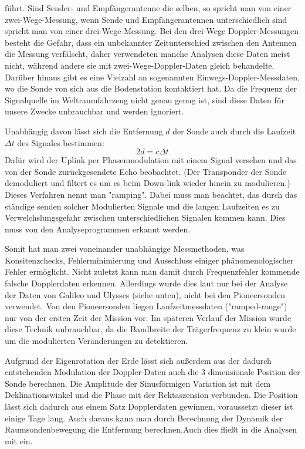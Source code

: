 führt.
Sind Sender- und Empfängerantenne die selben, so spricht man von einer zwei-Wege-Messung, wenn Sende und Empfängerantennen unterschiedlich sind spricht man von einer drei-Wege-Messung.\cite{Levy2009} Bei den drei-Wege Doppler-Messungen besteht die Gefahr, dass ein unbekannter Zeitunterschied zwischen den Antennen die Messung verfälscht, daher verwendeten manche Analysen diese Daten meist nicht,\cite{Anderson2002} während andere sie mit zwei-Wege-Doppler-Daten gleich behandelte.\cite{Markwardt2002} Darüber hinaus gibt es eine Vielzahl an sogenannten Einwegs-Doppler-Messdaten, wo die Sonde von sich aus die Bodenstation kontaktiert hat. Da die Frequenz der Signalquelle im Weltraumfahrzeug nicht genau genug ist, sind diese Daten für unsere Zwecke unbrauchbar und werden ignoriert. %

Unabhängig davon lässt sich die Entfernung $d$ der Sonde auch durch die Laufzeit $\Delta t$ des Signales bestimmen:
\begin{equation}
 2d = c \Delta t
\end{equation}
Dafür wird der Uplink per Phasenmodulation mit einem Signal versehen und das von der Sonde zurückgesendete Echo beobachtet. (Der Transponder der Sonde demoduliert und filtert es um es beim Down-link wieder hinein zu modulieren.) Dieses Verfahren nennt man "ramping". %
Dabei muss man beachtet, das durch das ständige senden solcher Modulierten Signale und die langen Laufzeiten es zu Verwelchslungsgefahr zwischen unterschiedlichen Signalen kommen kann. Dies muss von den Analyseprogrammen erkannt werden.

Somit hat man zwei voneinander unabhängige Messmethoden, was Konsitenzchecks,
Fehlerminimierung und Ausschluss einiger phänomenologischer Fehler ermöglicht. Nicht zuletzt kann man damit durch Frequenzfehler kommende falsche Dopplerdaten erkennen.\cite{Anderson2002}
Allerdings wurde dies laut \cite{Anderson2002} nur bei der Analyse der Daten von Galileo und Ulysses (siehe unten), nicht bei den Pioneersonden verwendet. Von den Pioneersonden liegen Laufzeitmessdaten ("ramped-range") nur von der ersten Zeit der Mission vor. Im späteren Verlauf der Mission wurde diese Technik unbrauchbar, da die Bandbreite der Trägerfrequenz zu klein wurde um die modulierten Veränderungen zu detektieren.\cite{Turyshev2010} %

Aufgrund der Eigenrotation der Erde lässt sich außerdem aus der dadurch entstehenden Modulation der Doppler-Daten auch die 3 dimensionale Position der Sonde berechnen. Die Amplitude der Sinusförmigen Variation ist mit dem Deklinationswinkel und die Phase mit der Rektaszension verbunden. Die Position lässt sich dadurch aus einem Satz Dopplerdaten gewinnen, voraussetzt dieser ist einige Tage lang. Auch daraus kann man durch Berechnung der Dynamik der Raumsondenbewegung die Entfernung berechnen.Auch dies fließt in die Analysen mit ein.\cite{Anderson2002} %


